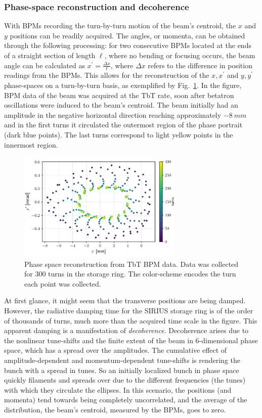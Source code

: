 \subsubsection{Phase-space reconstruction and decoherence}
With BPMs recording the turn-by-turn motion of the beam's centroid, the $x$ and $y$ positions can be readily acquired. The angles, or momenta, can be obtained through the following processing: for two consecutive BPMs located at the ends of a straight section of length $\ell$, where no bending or focusing occurs, the beam angle can be calculated as $x^\prime = \frac{\Delta x}{\ell}$, where $\Delta x$ refers to the difference in position readings from the BPMs. This allows for the reconstruction of the $x, x^\prime$ and $y, y^\prime$ phase-spaces on a turn-by-turn basis, as exemplified by Fig.~\ref{fig:phase_space_recons}. In the figure, BPM data of the beam was acquired at the TbT rate, soon after betatron oscillations were induced to the beam's centroid. The beam initially had an amplitude in the negative horizontal direction reaching approximately $-8~\unit{mm}$ and in the first turns it circulated the outermost region of the phase portrait (dark blue points). The last turns correspond to light yellow points in the innermost region.
\begin{figure}
    \centering
    \includegraphics[width=0.7\textwidth]{Images/phase_space_recons.pdf}
    \caption[Phase space reconstruction from TbT BPM data.]{Phase space reconstruction from TbT BPM data. Data was collected for 300 turns in the storage ring. The color-scheme encodes the turn each point was collected.}
    \label{fig:phase_space_recons}
\end{figure}

At first glance, it might seem that the transverse positions are being damped. However, the radiative damping time for the SIRIUS storage ring is of the order of thousands of turns, much more than the acquired time scale in the figure. This apparent damping is a manifestation of \textit{decoherence}. Decoherence arises due to the nonlinear tune-shifts and the finite extent of the beam in 6-dimensional phase space, which has a spread over the amplitudes. The cumulative effect of amplitude-dependent and momentum-dependent tune-shifts is rendering the bunch with a spread in tunes. So an initially localized bunch in phase space quickly filaments and spreads over due to the different frequencies (the tunes) with which they circulate the ellipses. In this scenario, the positions (and momenta) tend towards being completely uncorrelated, and the average of the distribution, the beam's centroid, measured by the BPMs, goes to zero.
